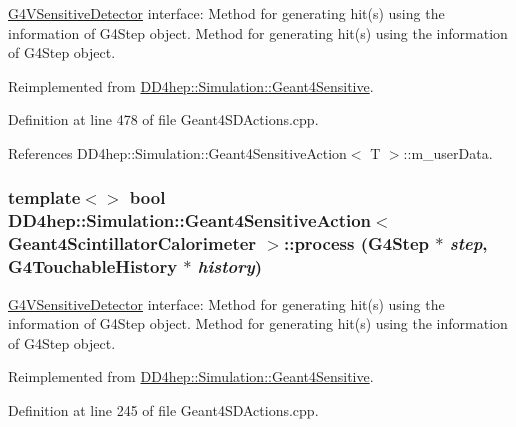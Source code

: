 \hyperlink{class_g4_v_sensitive_detector}{G4VSensitiveDetector} interface: Method for generating hit(s) using the information of G4Step object. Method for generating hit(s) using the information of G4Step object. 

Reimplemented from \hyperlink{class_d_d4hep_1_1_simulation_1_1_geant4_sensitive_a9a9463a6c29a66dad43a52ffc9f7838d}{DD4hep::Simulation::Geant4Sensitive}.

Definition at line 478 of file Geant4SDActions.cpp.

References DD4hep::Simulation::Geant4SensitiveAction$<$ T $>$::m\_\-userData.\hypertarget{class_d_d4hep_1_1_simulation_1_1_geant4_sensitive_action_a1828a968de6f07ff11e5b53f23593c3c}{
\subsubsection[{process}]{\setlength{\rightskip}{0pt plus 5cm}template$<$$>$ bool {\bf DD4hep::Simulation::Geant4SensitiveAction}$<$ {\bf Geant4ScintillatorCalorimeter} $>$::process (G4Step $\ast$ {\em step}, \/  G4TouchableHistory $\ast$ {\em history})}}
\label{class_d_d4hep_1_1_simulation_1_1_geant4_sensitive_action_a1828a968de6f07ff11e5b53f23593c3c}


\hyperlink{class_g4_v_sensitive_detector}{G4VSensitiveDetector} interface: Method for generating hit(s) using the information of G4Step object. Method for generating hit(s) using the information of G4Step object. 

Reimplemented from \hyperlink{class_d_d4hep_1_1_simulation_1_1_geant4_sensitive_a9a9463a6c29a66dad43a52ffc9f7838d}{DD4hep::Simulation::Geant4Sensitive}.

Definition at line 245 of file Geant4SDActions.cpp.

